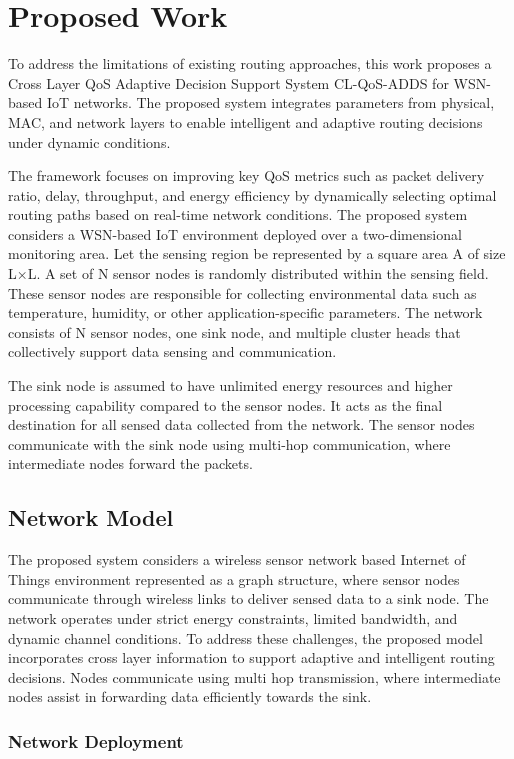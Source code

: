 \documentclass[a4paper,fleqn]{cas-dc}
\numberwithin{equation}{section}
\begin{document}
\section{Proposed Work}
To address the limitations of existing routing approaches, this work proposes a Cross Layer QoS Adaptive Decision Support System CL-QoS-ADDS for WSN-based IoT networks. The proposed system integrates parameters from physical, MAC, and network layers to enable intelligent and adaptive routing decisions under dynamic conditions.

The framework focuses on improving key QoS metrics such as packet delivery ratio, delay, throughput, and energy efficiency by dynamically selecting optimal routing paths based on real-time network conditions.
The proposed system considers a WSN-based IoT environment deployed over a two-dimensional monitoring area. Let the sensing region be represented by a square area A of size L×L.
A set of N sensor nodes is randomly distributed within the sensing field. These sensor nodes are responsible for collecting environmental data such as temperature, humidity, or other application-specific parameters.
The network consists of N sensor nodes, one sink node, and multiple cluster heads that collectively support data sensing and communication.

The sink node is assumed to have unlimited energy resources and higher processing capability compared to the sensor nodes. It acts as the final destination for all sensed data collected from the network. The sensor nodes communicate with the sink node using multi-hop communication, where intermediate nodes forward the packets.


\subsection{Network Model}
The proposed system considers a wireless sensor network based Internet of Things environment represented as a graph structure, where sensor nodes communicate through wireless links to deliver sensed data to a sink node. The network operates under strict energy constraints, limited bandwidth, and dynamic channel conditions. To address these challenges, the proposed model incorporates cross layer information to support adaptive and intelligent routing decisions. Nodes communicate using multi hop transmission, where intermediate nodes assist in forwarding data efficiently towards the sink.


\subsubsection{Network Deployment}
\end{document}
